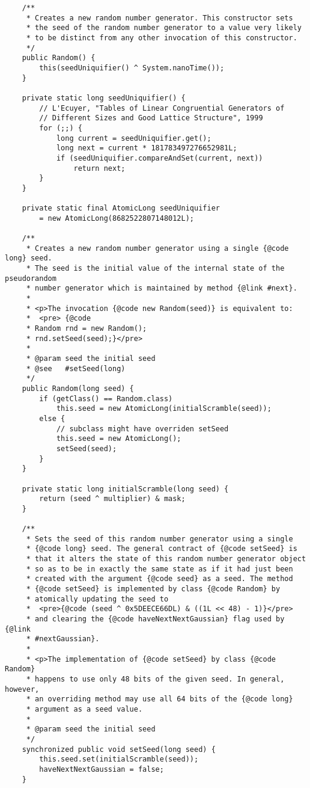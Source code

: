 \documentclass[12pt,a4paper,twoside,openright,titlepage,final]{article}
\begin{document}
\begin{verbatim}
    /**
     * Creates a new random number generator. This constructor sets
     * the seed of the random number generator to a value very likely
     * to be distinct from any other invocation of this constructor.
     */
    public Random() {
        this(seedUniquifier() ^ System.nanoTime());
    }

    private static long seedUniquifier() {
        // L'Ecuyer, "Tables of Linear Congruential Generators of
        // Different Sizes and Good Lattice Structure", 1999
        for (;;) {
            long current = seedUniquifier.get();
            long next = current * 181783497276652981L;
            if (seedUniquifier.compareAndSet(current, next))
                return next;
        }
    }

    private static final AtomicLong seedUniquifier
        = new AtomicLong(8682522807148012L);

    /**
     * Creates a new random number generator using a single {@code long} seed.
     * The seed is the initial value of the internal state of the pseudorandom
     * number generator which is maintained by method {@link #next}.
     *
     * <p>The invocation {@code new Random(seed)} is equivalent to:
     *  <pre> {@code
     * Random rnd = new Random();
     * rnd.setSeed(seed);}</pre>
     *
     * @param seed the initial seed
     * @see   #setSeed(long)
     */
    public Random(long seed) {
        if (getClass() == Random.class)
            this.seed = new AtomicLong(initialScramble(seed));
        else {
            // subclass might have overriden setSeed
            this.seed = new AtomicLong();
            setSeed(seed);
        }
    }

    private static long initialScramble(long seed) {
        return (seed ^ multiplier) & mask;
    }

    /**
     * Sets the seed of this random number generator using a single
     * {@code long} seed. The general contract of {@code setSeed} is
     * that it alters the state of this random number generator object
     * so as to be in exactly the same state as if it had just been
     * created with the argument {@code seed} as a seed. The method
     * {@code setSeed} is implemented by class {@code Random} by
     * atomically updating the seed to
     *  <pre>{@code (seed ^ 0x5DEECE66DL) & ((1L << 48) - 1)}</pre>
     * and clearing the {@code haveNextNextGaussian} flag used by {@link
     * #nextGaussian}.
     *
     * <p>The implementation of {@code setSeed} by class {@code Random}
     * happens to use only 48 bits of the given seed. In general, however,
     * an overriding method may use all 64 bits of the {@code long}
     * argument as a seed value.
     *
     * @param seed the initial seed
     */
    synchronized public void setSeed(long seed) {
        this.seed.set(initialScramble(seed));
        haveNextNextGaussian = false;
    }


\end{verbatim}
\end{document}
